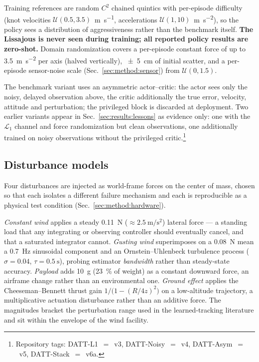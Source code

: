 Training references are random $C^2$ chained quintics with per-episode difficulty (knot
velocities $\mathcal{U}(0.5, 3.5)$~\si{\meter\per\second}, accelerations
$\mathcal{U}(1, 10)$~\si{\meter\per\second\squared}), so the policy sees a distribution
of aggressiveness rather than the benchmark itself. \textbf{The Lissajous is never seen
during training; all reported policy results are zero-shot.} Domain randomization covers
a per-episode constant force of up to \SI{3.5}{\meter\per\second\squared} per axis
(halved vertically), \SI{\pm5}{\centi\meter} of initial scatter, and a per-episode
sensor-noise scale (Sec.~\ref{sec:method:sensor}) from $\mathcal{U}(0, 1.5)$.

The benchmark variant uses an asymmetric actor--critic\cite{pinto2018asymmetric}: the
actor sees only the noisy, delayed observation above, the critic additionally the true
error, velocity, attitude and perturbation; the privileged block is discarded at
deployment. Two earlier variants appear in Sec.~\ref{sec:results:lessons} as evidence
only: one with the $\mathcal{L}_1$ channel and force randomization but clean
observations, one additionally trained on noisy observations without the privileged
critic.\footnote{Repository tags: DATT-L1~$=$~v3, DATT-Noisy~$=$~v4,
DATT-Asym~$=$~v5, DATT-Stack~$=$~v6a.}

\subsection{Disturbance models}
\label{sec:method:disturbance}

Four disturbances are injected as world-frame forces on the center of mass, chosen so
that each isolates a different failure mechanism and each is reproducible as a physical
test condition (Sec.~\ref{sec:method:hardware}).

\emph{Constant wind} applies a steady \SI{0.11}{\newton}
($\approx\SI{2.5}{\meter\per\second\squared}$) lateral force --- a standing load that
any integrating or observing controller should eventually cancel, and that a saturated
integrator cannot. \emph{Gusting wind} superimposes on a \SI{0.08}{\newton} mean a
\SI{0.7}{\hertz} sinusoidal component and an Ornstein--Uhlenbeck turbulence process
($\sigma = 0.04$, $\tau = \SI{0.5}{\second}$), probing estimator \emph{bandwidth} rather
than steady-state accuracy. \emph{Payload} adds \SI{10}{\gram} (\SI{23}{\percent} of
weight) as a constant downward force, an airframe change rather than an environmental
one. \emph{Ground effect} applies the Cheeseman--Bennett thrust
gain\cite{cheeseman1955ige} $1/\big(1 - (R/4z)^2\big)$ on a low-altitude trajectory,
a multiplicative actuation disturbance rather than an additive force. The magnitudes
bracket the perturbation range used in the learned-tracking
literature\cite{huang2023datt} and sit within the envelope of the wind facility.

